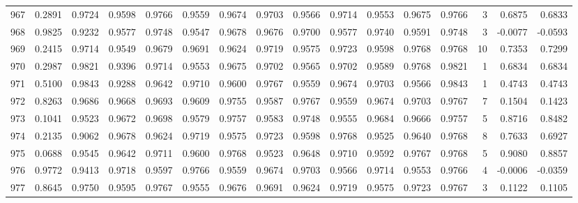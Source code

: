 \begin{tabular}{lrrrrrrrrrrrrrrr}
967 &      0.2891 &  0.9724 &  0.9598 &  0.9766 &  0.9559 &  0.9674 &  0.9703 &  0.9566 &  0.9714 &  0.9553 &   0.9675 &     0.9766 &      3 &                    0.6875 &                     0.6833 \\
968 &      0.9825 &  0.9232 &  0.9577 &  0.9748 &  0.9547 &  0.9678 &  0.9676 &  0.9700 &  0.9577 &  0.9740 &   0.9591 &     0.9748 &      3 &                   -0.0077 &                    -0.0593 \\
969 &      0.2415 &  0.9714 &  0.9549 &  0.9679 &  0.9691 &  0.9624 &  0.9719 &  0.9575 &  0.9723 &  0.9598 &   0.9768 &     0.9768 &     10 &                    0.7353 &                     0.7299 \\
970 &      0.2987 &  0.9821 &  0.9396 &  0.9714 &  0.9553 &  0.9675 &  0.9702 &  0.9565 &  0.9702 &  0.9589 &   0.9768 &     0.9821 &      1 &                    0.6834 &                     0.6834 \\
971 &      0.5100 &  0.9843 &  0.9288 &  0.9642 &  0.9710 &  0.9600 &  0.9767 &  0.9559 &  0.9674 &  0.9703 &   0.9566 &     0.9843 &      1 &                    0.4743 &                     0.4743 \\
972 &      0.8263 &  0.9686 &  0.9668 &  0.9693 &  0.9609 &  0.9755 &  0.9587 &  0.9767 &  0.9559 &  0.9674 &   0.9703 &     0.9767 &      7 &                    0.1504 &                     0.1423 \\
973 &      0.1041 &  0.9523 &  0.9672 &  0.9698 &  0.9579 &  0.9757 &  0.9583 &  0.9748 &  0.9555 &  0.9684 &   0.9666 &     0.9757 &      5 &                    0.8716 &                     0.8482 \\
974 &      0.2135 &  0.9062 &  0.9678 &  0.9624 &  0.9719 &  0.9575 &  0.9723 &  0.9598 &  0.9768 &  0.9525 &   0.9640 &     0.9768 &      8 &                    0.7633 &                     0.6927 \\
975 &      0.0688 &  0.9545 &  0.9642 &  0.9711 &  0.9600 &  0.9768 &  0.9523 &  0.9648 &  0.9710 &  0.9592 &   0.9767 &     0.9768 &      5 &                    0.9080 &                     0.8857 \\
976 &      0.9772 &  0.9413 &  0.9718 &  0.9597 &  0.9766 &  0.9559 &  0.9674 &  0.9703 &  0.9566 &  0.9714 &   0.9553 &     0.9766 &      4 &                   -0.0006 &                    -0.0359 \\
977 &      0.8645 &  0.9750 &  0.9595 &  0.9767 &  0.9555 &  0.9676 &  0.9691 &  0.9624 &  0.9719 &  0.9575 &   0.9723 &     0.9767 &      3 &                    0.1122 &                     0.1105 \\

\end{tabular}
